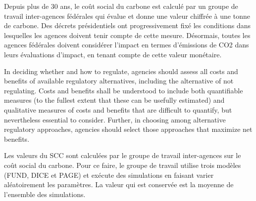 Depuis plus de 30 ans, le coût social du carbone est calculé par un groupe de travail inter-agences fédérales qui évalue et donne une valeur chiffrée à une tonne de carbone. Des décrets présidentiels ont progressivement fixé les conditions dans lesquelles les agences doivent tenir compte de cette mesure. Désormais, toutes les agences fédérales doivent considérer l'impact en termes d’émissions de CO2 dans leurs évaluations d'impact, en tenant compte de cette valeur monétaire. \\

\begin{displayquote}
     In deciding whether and how to regulate, agencies should assess all costs and benefits of available regulatory alternatives, including the alternative of not regulating. Costs and benefits shall be understood to include both quantifiable measures (to the fullest extent that these can be usefully estimated) and qualitative measures of costs and benefits that are difficult to quantify, but nevertheless essential to consider. Further, in choosing among alternative regulatory approaches, agencies should select those approaches that maximize net benefits. 
\end{displayquote}

Les valeurs du SCC sont calculées par le groupe de travail inter-agences sur le coût social du carbone. Pour ce faire, le groupe de travail utilise trois modèles (FUND, DICE et PAGE) et exécute des simulations en faisant varier aléatoirement les paramètres. La valeur qui est conservée est la moyenne de l'ensemble des simulations. 

